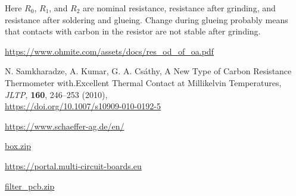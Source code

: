 \documentclass[a4paper]{article}
\begin{document}
Here $R_0$, $R_1$, and $R_2$ are nominal resistance, resistance after
grinding, and resistance after soldering and glueing. Change during
glueing probably means that contacts with carbon in the resistor
are not stable after grinding.

\begin{thebibliography}{}

\url{https://www.ohmite.com/assets/docs/res\_od\_of\_oa.pdf}

N. Samkharadze, A. Kumar, G. A. Cs{\'a}thy,
A New Type of Carbon Resistance Thermometer with.Excellent Thermal Contact at Millikelvin Temperatures,
{\it JLTP}, {\bf 160}, 246--253 (2010),\\
\url{https://doi.org/10.1007/s10909-010-0192-5}

\url{https://www.schaeffer-ag.de/en/}

\url{box.zip}

\url{https://portal.multi-circuit-boards.eu}

\url{filter\_pcb.zip}

\end{thebibliography}
\end{document}
